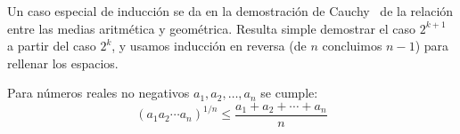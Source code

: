   Un caso especial de inducción
  se da en la demostración de  Cauchy~%
    \cite{cauchy21:_cours_analyse-1}%
  de la relación entre las medias aritmética y geométrica.%
  Resulta simple demostrar
  el caso \(2^{k + 1}\) a partir del caso \(2^k\),
  y usamos inducción en reversa
  (de \(n\) concluimos \(n - 1\))
  para rellenar los espacios.
  \begin{theorem}
    \label{theo:AM-GM-inequality}
    Para números reales no negativos
    \(a_1, a_2, \dotsc, a_n\)
    se cumple:
    \begin{equation*}
      (a_1 a_2 \dotsm a_n)^{1/n}
	\le \frac{a_1 + a_2 + \dotsb + a_n}{n}
    \end{equation*}
  \end{theorem}
